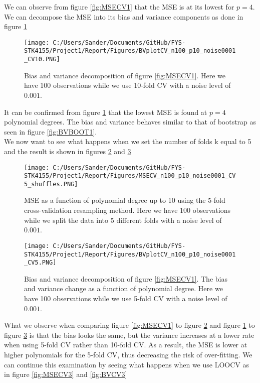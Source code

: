 \documentclass[12pt,a4paper]{article}
\begin{document}
\noindent We can observe from figure \ref{fig:MSECV1} that the MSE is at its lowest for $p = 4$. We can decompose the MSE into its bias and variance components as done in figure \ref{fig:BVCV1}

\begin{figure}[H]
\centering
\texttt{[image: C:/Users/Sander/Documents/GitHub/FYS-STK4155/Project1/Report/Figures/BVplotCV\_n100\_p10\_noise0001\_CV10.PNG]}
\caption{\label{fig:BVCV1} Bias and variance decomposition of figure \ref{fig:MSECV1}. Here we have 100 observations while we use 10-fold CV with a noise level of $0.001$.}
\end{figure}

\noindent It can be confirmed from figure \ref{fig:BVCV1} that the lowest MSE is found at $p = 4$ polynomial degrees. The bias and variance behaves similar to that of bootstrap as seen in figure \ref{fig:BVBOOT1}. 
\\
We now want to see what happens when we set the number of folds k equal to 5 and the result is shown in figures \ref{fig:MSECV2} and \ref{fig:BVCV2}

\begin{figure}[H]
\centering
\texttt{[image: C:/Users/Sander/Documents/GitHub/FYS-STK4155/Project1/Report/Figures/MSECV\_n100\_p10\_noise0001\_CV5\_shuffles.PNG]}
\caption{\label{fig:MSECV2} MSE as a function of polynomial degree up to 10 using the 5-fold cross-validation resampling method. Here we have 100 observations while we split the data into 5 different folds with a noise level of $0.001$.}
\end{figure}

\begin{figure}[H]
\centering
\texttt{[image: C:/Users/Sander/Documents/GitHub/FYS-STK4155/Project1/Report/Figures/BVplotCV\_n100\_p10\_noise0001\_CV5.PNG]}
\caption{\label{fig:BVCV2} Bias and variance decomposition of figure \ref{fig:MSECV1}. The bias and variance change as a function of polynomial degree. Here we have 100 observations while we use 5-fold CV with a noise level of $0.001$.}
\end{figure}

\noindent What we observe when comparing figure \ref{fig:MSECV1} to figure \ref{fig:MSECV2} and figure \ref{fig:BVCV1} to figure \ref{fig:BVCV2} is that the bias looks the same, but the variance increases at a lower rate when using 5-fold CV rather than 10-fold CV. As a result, the MSE is lower at higher polynomials for the 5-fold CV, thus decreasing the risk of over-fitting. We can continue this examination by seeing what happens when we use LOOCV as in figure \ref{fig:MSECV3} and \ref{fig:BVCV3}
\end{document}
